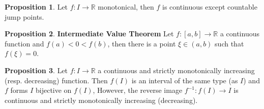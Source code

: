\documentclass{article}
\theoremstyle{definition}
\newtheorem{prop}{Proposition}[subsection]
\begin{document}
\begin{prop}
Let $f: I\to\mathbb{R}$ monotonical, then $f$ is continuous except countable jump points.
\end{prop}
\begin{prop}
\textbf{Intermediate Value Theorem} Let $f:[a,b]\to \mathbb{R}$ a continuous function and $f(a)<0<f(b)$, then there is a point $\xi\in (a,b)$ such that $f(\xi)=0$.
\end{prop}
\begin{prop}
Let $f: I \to \mathbb{R}$ a continuous and strictly monotonically increasing (resp. decreasing) function. Then $f(I)$ is an interval of the same type (as $I$) and $f$ forms $I$ bijective on $f(I)$, However, the reverse image $f^{-1}: f(I)\to I$ is continuous and strictly monotonically increasing (decreasing). 
\end{prop}
\end{document}

